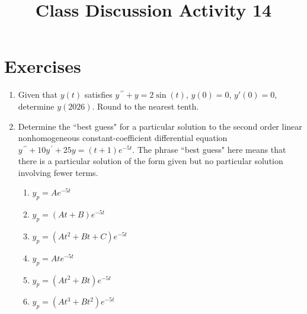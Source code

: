 \documentclass{ximera}
\begin{document}
\begin{abstract}
 \end{abstract}

    \title{Class Discussion Activity 14}
    
    \maketitle

\section*{Exercises}

\begin{enumerate}[label=(\arabic*)]

\item Given that $y(t)$ satisfies $y^{\,\prime\prime}+y=2\sin (t)$, $y(0)=0$, $y'(0)=0$, determine $y(2026)$.  Round to the nearest tenth.




  
 

 




\item Determine the ``best guess" for a particular solution to the second order linear nonhomogeneous constant-coefficient differential equation \\$y^{\,\prime\prime}+10y^{\,\prime}+25y=(t+1)e^{-5t}$.  The phrase ``best guess" here means that there is a particular solution of the form given but no particular solution involving fewer terms.

\begin{enumerate}[label=(\alph*)]
\item $y_p=Ae^{-5t}$
\item $y_p=(At+B)e^{-5t}$  
\item $y_p=(At^2+Bt+C)e^{-5t}$
\item $y_p=Ate^{-5t}$
\item $y_p=(At^2+Bt)e^{-5t}$ 
\item $y_p=(At^3+Bt^2)e^{-5t}$ 
\end{enumerate}


\end{enumerate}
\end{document}
